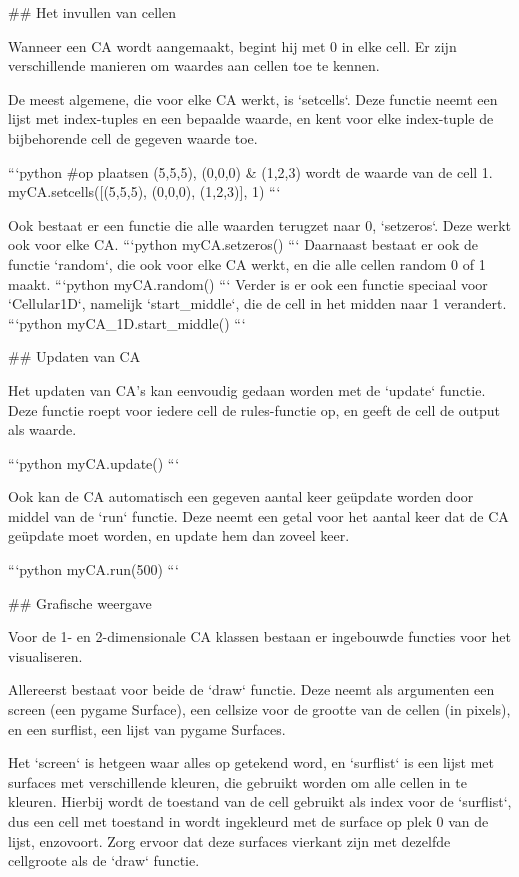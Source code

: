 \documentclass{article}
\begin{document}
\begin{markdown}
## Het invullen van cellen

Wanneer een CA wordt aangemaakt, begint hij met 0 in elke cell. Er zijn verschillende manieren om waardes aan cellen toe te kennen. 

De meest algemene, die voor elke CA werkt, is `setcells`. Deze functie neemt een lijst met index-tuples en een bepaalde waarde, en kent voor elke index-tuple de bijbehorende cell de gegeven waarde toe. 

```python
#op plaatsen (5,5,5), (0,0,0) & (1,2,3) wordt de waarde van de cell 1. 
myCA.setcells([(5,5,5), (0,0,0), (1,2,3)], 1)
```

Ook bestaat er een functie die alle waarden terugzet naar 0, `setzeros`. Deze werkt ook voor elke CA.
```python
myCA.setzeros()
```
Daarnaast bestaat er ook de functie `random`, die ook voor elke CA werkt, en die alle cellen random 0 of 1 maakt. 
```python
myCA.random()
```
Verder is er ook een functie speciaal voor `Cellular1D`, namelijk `start_middle`, die de cell in het midden naar 1 verandert. 
```python
myCA_1D.start_middle()
```

## Updaten van CA

Het updaten van CA's kan eenvoudig gedaan worden met de `update` functie. Deze functie roept voor iedere cell de rules-functie op, en geeft de cell de output als waarde. 

```python
myCA.update()
```

Ook kan de CA automatisch een gegeven aantal keer geüpdate worden door middel van de `run` functie. Deze neemt een getal voor het aantal keer dat de CA geüpdate moet worden, en update hem dan zoveel keer.

```python
myCA.run(500)
```

## Grafische weergave

Voor de 1- en 2-dimensionale CA klassen bestaan er ingebouwde functies voor het visualiseren. 

Allereerst bestaat voor beide de `draw` functie. Deze neemt als argumenten een screen (een pygame Surface), een cellsize voor de grootte van de cellen (in pixels), en een surflist, een lijst van pygame Surfaces. 

Het `screen` is hetgeen waar alles op getekend word, en `surflist` is een lijst met surfaces met verschillende kleuren, die gebruikt worden om alle cellen in te kleuren. Hierbij wordt de toestand van de cell gebruikt als index voor de `surflist`, dus een cell met toestand in wordt ingekleurd met de surface op plek 0 van de lijst, enzovoort. Zorg ervoor dat deze surfaces vierkant zijn met dezelfde cellgroote als de `draw` functie.


\end{markdown}
\end{document}
